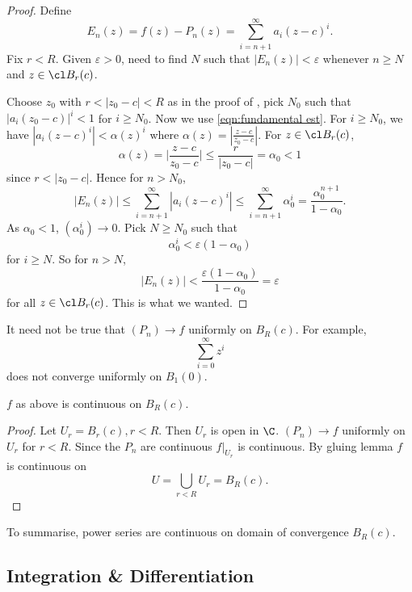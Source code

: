 \documentclass[a4paper]{article}
\theoremstyle{definition}
\begin{document}
\begin{proof}
  Define
  \[
    E_n(z) = f(z) - P_n(z) = \sum_{i=n+1}^{\infty}a_i(z-c)^i. 
  \]
  Fix \(r< R\). Given \(\varepsilon>0\), need to find \(N \) such that \(|E_n(z)| < \varepsilon\) whenever \(n\geq N\) and \(z\in \cl B_r(c)\).

  Choose \(z_0\) with \(r< |z_0-c| < R\) as in the proof of , pick \(N_0\) such that \(|a_i(z_0-c)|^i<1\) for \(i\geq N_0\). Now we use \ref{eqn:fundamental est}. For \(i\geq N_0\), we have \(|a_i(z-c)^i| < \alpha(z)^i\) where \(\alpha(z) = |\frac{z-c}{z_0-c}|\). For \(z\in \cl B_r(c)\),
  \[
    \alpha(z) = \Big| \frac{z-c}{z_0-c} \Big| \leq \frac{r}{|z_0-c|} = \alpha_0 < 1
  \]
  since \(r < |z_0-c|\). Hence for \(n>N_0\),
  \[
    |E_n(z)| \leq \sum_{i=n+1}^{\infty}|a_i(z-c)^i| \leq \sum_{i=n+1}^{\infty}\alpha_0^i = \frac{\alpha_0^{n+1}}{1-\alpha_0}.
  \]
  As \(\alpha_0 < 1\), \((\alpha_0^i)\to 0\). Pick \(N\geq N_0\) such that
  \[
\alpha_0^i < \varepsilon (1-\alpha_0)
  \]
  for \(i\geq N\). So for \(n>N\),
  \[
    |E_n(z)| < \frac{\varepsilon (1-\alpha_0)}{1-\alpha_0} = \varepsilon
  \]
  for all \(z\in \cl B_r(c)\).
  This is what we wanted.
\end{proof}

\begin{note}
  It need not be true that \((P_n)\to f\) uniformly on \(B_R(c)\). For example,
  \[
    \sum_{i=0}^{\infty}z^i
  \]
  does not converge uniformly on \(B_1(0)\).
\end{note}

\begin{corollary}
  \(f\) as above is continuous on \(B_R(c)\).
\end{corollary}

\begin{proof}
  Let \(U_r = B_r(c), r<R\). Then \(U_r\) is open in \(\C\). \((P_n)\to f\) uniformly on \(U_r\) for \(r< R\). Since the \(P_n\) are continuous \(f|_{U_r}\) is continuous. By gluing lemma \(f\) is continuous on
  \[
    U = \bigcup_{r<R} U_r = B_R(c).
  \]
\end{proof}

To summarise, power series are continuous on domain of convergence \(B_R(c)\).

\subsection{Integration \& Differentiation}
\end{document}
